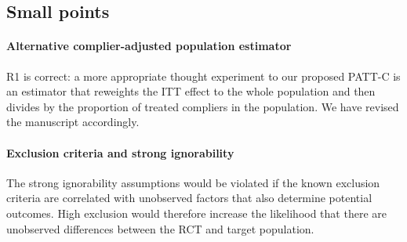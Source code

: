 \documentclass[hidelinks,12pt,letterpaper]{article}
\begin{document}

\subsection{Small points}

\paragraph*{Alternative complier-adjusted population estimator}

R1 is correct: a more appropriate thought experiment to our proposed PATT-C is an estimator that reweights the ITT effect to the whole population and then divides by the proportion of treated compliers in the population. We have revised the manuscript accordingly. 


\paragraph*{Exclusion criteria and strong ignorability}

The strong ignorability assumptions would be violated if the known exclusion criteria are correlated with unobserved factors that also determine potential outcomes. High exclusion would therefore increase the likelihood that there are unobserved differences between the RCT and target population.  
\end{document}
